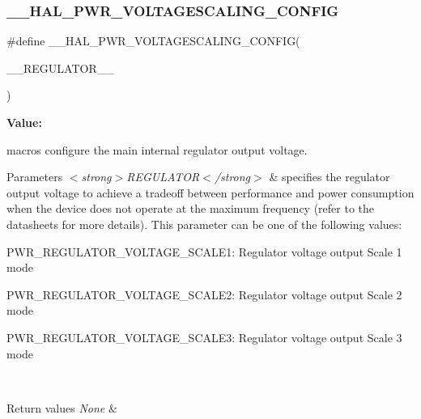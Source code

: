 \subsubsection{\texorpdfstring{\_\_HAL\_PWR\_VOLTAGESCALING\_CONFIG}{\_\_HAL\_PWR\_VOLTAGESCALING\_CONFIG}}
{\footnotesize\ttfamily \#define \+\_\+\+\_\+\+H\+A\+L\+\_\+\+P\+W\+R\+\_\+\+V\+O\+L\+T\+A\+G\+E\+S\+C\+A\+L\+I\+N\+G\+\_\+\+C\+O\+N\+F\+IG(\begin{DoxyParamCaption}\item[{}]{\+\_\+\+\_\+\+R\+E\+G\+U\+L\+A\+T\+O\+R\+\_\+\+\_\+ }\end{DoxyParamCaption})}

{\bfseries Value\+:}
\begin{DoxyCode}{0}
\DoxyCodeLine{\textcolor{keywordflow}{do} \{                                                     \(\backslash\)}
\DoxyCodeLine{                                                            \textcolor{comment}{/* Delay after an RCC peripheral clock enabling */}  \(\backslash\)}

\end{DoxyCode}


macros configure the main internal regulator output voltage. 


\begin{DoxyParams}{Parameters}
{\em $<$strong$>$\+R\+E\+G\+U\+L\+A\+T\+O\+R$<$/strong$>$} & specifies the regulator output voltage to achieve a tradeoff between performance and power consumption when the device does not operate at the maximum frequency (refer to the datasheets for more details). This parameter can be one of the following values\+: \begin{DoxyItemize}
\item P\+W\+R\+\_\+\+R\+E\+G\+U\+L\+A\+T\+O\+R\+\_\+\+V\+O\+L\+T\+A\+G\+E\+\_\+\+S\+C\+A\+L\+E1\+: Regulator voltage output Scale 1 mode \item P\+W\+R\+\_\+\+R\+E\+G\+U\+L\+A\+T\+O\+R\+\_\+\+V\+O\+L\+T\+A\+G\+E\+\_\+\+S\+C\+A\+L\+E2\+: Regulator voltage output Scale 2 mode \item P\+W\+R\+\_\+\+R\+E\+G\+U\+L\+A\+T\+O\+R\+\_\+\+V\+O\+L\+T\+A\+G\+E\+\_\+\+S\+C\+A\+L\+E3\+: Regulator voltage output Scale 3 mode \end{DoxyItemize}
\\
\hline
\end{DoxyParams}

\begin{DoxyRetVals}{Return values}
{\em None} & \\
\hline
\end{DoxyRetVals}

